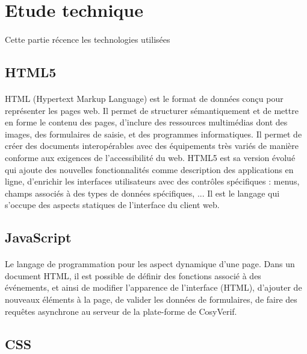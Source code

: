 \documentclass{report}
\begin{document}
\section{Etude technique}

\paragraph{}
Cette partie récence les technologies utilisées

\subsection*{HTML5}

\paragraph{}
HTML (Hypertext Markup Language) est le format de données conçu pour représenter les pages web. Il permet de 
structurer sémantiquement et de mettre en forme le contenu des pages, d’inclure des ressources multimédias dont des 
images, des formulaires de saisie, et des programmes informatiques. Il permet de créer des documents interopérables 
avec des équipements très variés de manière conforme aux exigences de l’accessibilité du web. HTML5 est sa version
évolué qui ajoute des nouvelles fonctionnalités comme description des applications en ligne, d'enrichir les interfaces
utilisateurs avec des contrôles spécifiques : menus, champs associés à des types de données spécifiques, ... Il est le
langage qui s'occupe des aspects statiques de l'interface du client web.


\subsection*{JavaScript}

\paragraph{}
Le langage de programmation pour les aspect dynamique d'une page. Dans un document HTML, il est possible de définir 
des fonctions associé à des événements, et ainsi de modifier l’apparence de l'interface (HTML), d'ajouter de nouveaux 
éléments à la page, de valider les données de formulaires, de faire des requêtes asynchrone au serveur de la plate-forme
de CosyVerif.

\subsection*{CSS}
\end{document}
